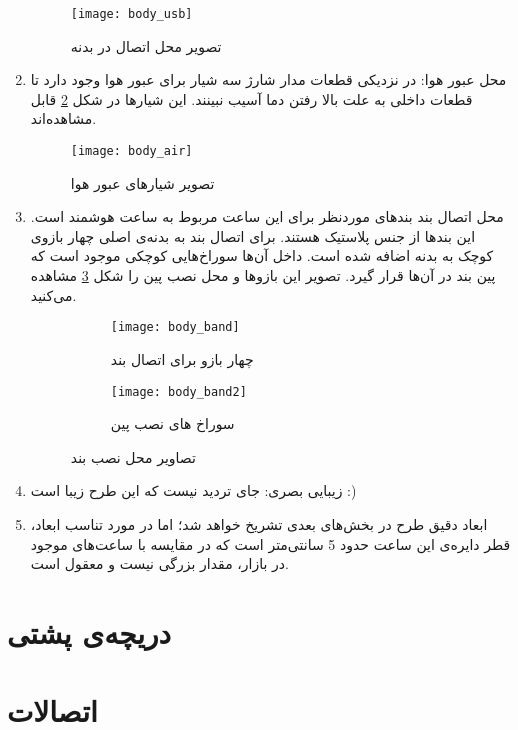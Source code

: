 \begin{enumerate}
	\begin{figure}[h]
		\centering
		\texttt{[image: body\_usb]}
		\caption{تصویر محل اتصال  در بدنه}
		\label{fig:body-usb}
	\end{figure}
	
	\item محل عبور هوا:
	در نزدیکی قطعات مدار شارژ سه شیار برای عبور هوا وجود دارد تا قطعات داخلی به علت بالا رفتن دما آسیب نبینند. این شیارها در شکل \ref{fig:body-air} قابل مشاهده‌اند.
	
	\begin{figure}[h]
		\centering
		\texttt{[image: body\_air]}
		\caption{تصویر شیارهای عبور هوا}
		\label{fig:body-air}
	\end{figure}

	\item محل اتصال بند
	بندهای موردنظر برای این ساعت مربوط به ساعت هوشمند  است. این بندها از جنس پلاستیک هستند. برای اتصال بند به بدنه‌ی اصلی چهار بازوی کوچک به بدنه اضافه شده است. داخل آن‌ها سوراخ‌هایی کوچکی موجود است که پین بند در آن‌ها قرار گیرد. تصویر این بازوها و محل نصب پین را شکل \ref{fig:body-band} مشاهده می‌کنید.
	
	\begin{figure}[h]
		\centering
		\begin{subfigure}{0.4\textwidth}
			\centering
			\texttt{[image: body\_band]}
			\caption{چهار بازو برای اتصال بند}
		\end{subfigure}
		\begin{subfigure}{0.3\textwidth}
			\centering
			\texttt{[image: body\_band2]}
			\caption{سوراخ های نصب پین}
		\end{subfigure}
		\caption{تصاویر محل نصب بند}
		\label{fig:body-band}
	\end{figure}

	\item زیبایی بصری: جای تردید نیست که این طرح زیبا است :)
	\item ابعاد دقیق طرح در بخش‌های بعدی تشریخ خواهد شد؛ اما در مورد تناسب ابعاد، قطر دایره‌ی این ساعت حدود 5 سانتی‌متر است که در مقایسه با ساعت‌های موجود در بازار، مقدار بزرگی نیست و معقول است.
\end{enumerate}


\section{دریچه‌ی پشتی}


\section{اتصالات}


